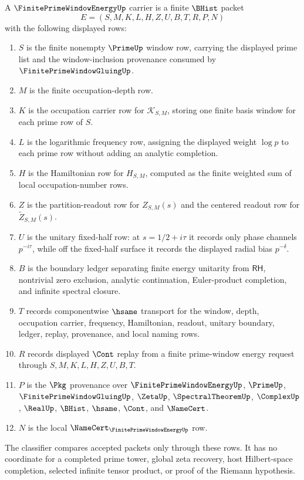 \begin{definition}
\label{def:finite-prime-window-energy-carrier}
A $\FinitePrimeWindowEnergyUp$ carrier is a finite $\BHist$ packet
$$
E=(S,M,K,L,H,Z,U,B,T,R,P,N)
$$
with the following displayed rows:
\begin{enumerate}
\item $S$ is the finite nonempty $\PrimeUp$ window row, carrying the displayed prime list and the window-inclusion provenance consumed by $\FinitePrimeWindowGluingUp$.
\item $M$ is the finite occupation-depth row.
\item $K$ is the occupation carrier row for $\mathcal K_{S,M}$, storing one finite basis window for each prime row of $S$.
\item $L$ is the logarithmic frequency row, assigning the displayed weight $\log p$ to each prime row without adding an analytic completion.
\item $H$ is the Hamiltonian row for $H_{S,M}$, computed as the finite weighted sum of local occupation-number rows.
\item $Z$ is the partition-readout row for $Z_{S,M}(s)$ and the centered readout row for $\widetilde Z_{S,M}(s)$.
\item $U$ is the unitary fixed-half row: at $s=1/2+i\tau$ it records only phase channels $p^{-i\tau}$, while off the fixed-half surface it records the displayed radial bias $p^{-\delta}$.
\item $B$ is the boundary ledger separating finite energy unitarity from $\mathsf{RH}$, nontrivial zero exclusion, analytic continuation, Euler-product completion, and infinite spectral closure.
\item $T$ records componentwise $\hsame$ transport for the window, depth, occupation carrier, frequency, Hamiltonian, readout, unitary boundary, ledger, replay, provenance, and local naming rows.
\item $R$ records displayed $\Cont$ replay from a finite prime-window energy request through $S,M,K,L,H,Z,U,B,T$.
\item $P$ is the $\Pkg$ provenance over $\FinitePrimeWindowEnergyUp$, $\PrimeUp$, $\FinitePrimeWindowGluingUp$, $\ZetaUp$, $\SpectralTheoremUp$, $\ComplexUp$, $\RealUp$, $\BHist$, $\hsame$, $\Cont$, and $\NameCert$.
\item $N$ is the local $\NameCert_{\FinitePrimeWindowEnergyUp}$ row.
\end{enumerate}
The classifier compares accepted packets only through these rows. It has no coordinate for a completed prime tower, global zeta recovery, host Hilbert-space completion, selected infinite tensor product, or proof of the Riemann hypothesis.
\end{definition}

